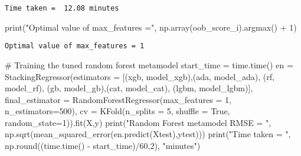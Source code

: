 \documentclass[
  letterpaper,
  DIV=11,
  numbers=noendperiod]{scrreprt}
\newenvironment{Shaded}{\begin{snugshade}}{\end{snugshade}}
\newcommand{\BuiltInTok}[1]{\textcolor[rgb]{0.00,0.23,0.31}{#1}}
\newcommand{\CommentTok}[1]{\textcolor[rgb]{0.37,0.37,0.37}{#1}}
\newcommand{\DecValTok}[1]{\textcolor[rgb]{0.68,0.00,0.00}{#1}}
\newcommand{\NormalTok}[1]{\textcolor[rgb]{0.00,0.23,0.31}{#1}}
\newcommand{\OperatorTok}[1]{\textcolor[rgb]{0.37,0.37,0.37}{#1}}
\newcommand{\StringTok}[1]{\textcolor[rgb]{0.13,0.47,0.30}{#1}}
\newcommand{\VariableTok}[1]{\textcolor[rgb]{0.07,0.07,0.07}{#1}}
\begin{document}
\begin{verbatim}
Time taken =  12.08 minutes
\end{verbatim}

\begin{Shaded}
\begin{Highlighting}[]
\BuiltInTok{print}\NormalTok{(}\StringTok{"Optimal value of max\_features ="}\NormalTok{, np.array(oob\_score\_i).argmax() }\OperatorTok{+} \DecValTok{1}\NormalTok{)}
\end{Highlighting}
\end{Shaded}

\begin{verbatim}
Optimal value of max_features = 1
\end{verbatim}

\begin{Shaded}
\begin{Highlighting}[]
\CommentTok{\# Training the tuned random forest metamodel}
\NormalTok{start\_time }\OperatorTok{=}\NormalTok{ time.time()}
\NormalTok{en }\OperatorTok{=}\NormalTok{ StackingRegressor(estimators }\OperatorTok{=}\NormalTok{ [(}\StringTok{\textquotesingle{}xgb\textquotesingle{}}\NormalTok{, model\_xgb),(}\StringTok{\textquotesingle{}ada\textquotesingle{}}\NormalTok{, model\_ada),}
\NormalTok{                    (}\StringTok{\textquotesingle{}rf\textquotesingle{}}\NormalTok{, model\_rf), (}\StringTok{\textquotesingle{}gb\textquotesingle{}}\NormalTok{, model\_gb),(}\StringTok{\textquotesingle{}cat\textquotesingle{}}\NormalTok{, model\_cat), }
\NormalTok{                    (}\StringTok{\textquotesingle{}lgbm\textquotesingle{}}\NormalTok{, model\_lgbm)],}
\NormalTok{                final\_estimator }\OperatorTok{=}\NormalTok{ RandomForestRegressor(max\_features }\OperatorTok{=} \DecValTok{1}\NormalTok{, }
\NormalTok{                n\_estimators}\OperatorTok{=}\DecValTok{500}\NormalTok{), cv }\OperatorTok{=}\NormalTok{ KFold(n\_splits }\OperatorTok{=} \DecValTok{5}\NormalTok{, shuffle }\OperatorTok{=} \VariableTok{True}\NormalTok{, }
\NormalTok{                random\_state}\OperatorTok{=}\DecValTok{1}\NormalTok{)).fit(X,y)}
\BuiltInTok{print}\NormalTok{(}\StringTok{"Random Forest metamodel RMSE = "}\NormalTok{, np.sqrt(mean\_squared\_error(en.predict(Xtest),ytest)))}
\BuiltInTok{print}\NormalTok{(}\StringTok{"Time taken = "}\NormalTok{, np.}\BuiltInTok{round}\NormalTok{((time.time() }\OperatorTok{{-}}\NormalTok{ start\_time)}\OperatorTok{/}\DecValTok{60}\NormalTok{,}\DecValTok{2}\NormalTok{), }\StringTok{"minutes"}\NormalTok{)}
\end{Highlighting}
\end{Shaded}
\end{document}
